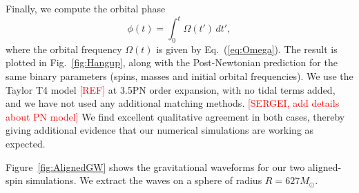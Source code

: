 \documentclass[aps,prd,amsmath,floatfix
,twocolumn
,superscriptaddress,nofootinbib,showpacs]{revtex4-1}
\theoremstyle{plain} \newtheorem{thm}{Theorem} \newtheorem{lem}{Lemma}
\newcommand{\red}[1]{\textcolor{Red}{#1}}
\begin{document}

Finally, we compute the orbital phase 
\begin{equation}
\phi(t) = \int_0^t \Omega(t')\, dt',
\end{equation}
where the orbital frequency $\Omega(t)$ is given by
Eq.~(\ref{eq:Omega}).
The result is plotted in Fig.~\ref{fig:Hangup}, along with the
Post-Newtonian prediction for the same binary parameters (spins,
masses and initial orbital frequencies). We use the Taylor T4 model
\red{[REF]} at 3.5PN order expansion, with no tidal terms added, and
we have not used any additional matching methods. \red{[SERGEI, add
  details about PN model]} We find excellent qualitative agreement in
both cases, thereby giving additional evidence that our numerical
simulations are working as expected.

Figure~\ref{fig:AlignedGW} shows the gravitational waveforms for our
two aligned-spin simulations. We extract the waves on a sphere of
radius $R=627M_{\odot}$. 
\end{document}
